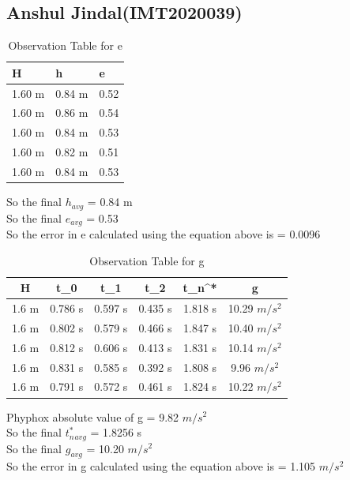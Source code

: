 \documentclass[11pt]{scrartcl} %
\begin{document}
\newpage
\subsection{Anshul Jindal(IMT2020039)}

\begin{table}[h] %
	\centering %
	\begin{tabular}{l l l}
		\toprule
		\textbf{H} & \textbf{h} & \textbf{e} \\
		\midrule
		1.60 m & 0.84 m & 0.52\\
        1.60 m & 0.86 m & 0.54\\
        1.60 m & 0.84 m & 0.53\\
        1.60 m & 0.82 m & 0.51 \\
        1.60 m & 0.84 m & 0.53 \\
		\bottomrule
	\end{tabular}
	\caption{Observation Table for e}
\end{table}
So the final $h_{avg}$ = 0.84 m\\
So the final $e_{avg}$ = 0.53\\
So the error in e calculated using the equation above is  = 0.0096 

\begin{table}[h]
\centering
\begin{tabular}{||c c c c c c||} 
\toprule
 \hline
 H & t_0 & t_1 & t_2 & t_n^* & g \\ [0.5ex] 
 \midrule
 \hline\hline
 1.6 m & 0.786 s & 0.597 s  & 0.435 s & 1.818 s & 10.29 $m/s^2$ \\
 \hline
 1.6 m & 0.802 s & 0.579 s & 0.466 s & 1.847 s & 10.40 $m/s^2$  \\
 \hline
 1.6 m & 0.812 s & 0.606 s & 0.413 s & 1.831 s  & 10.14 $m/s^2$ \\
 \hline
 1.6 m & 0.831 s & 0.585 s & 0.392 s & 1.808 s  & 9.96 $m/s^2$  \\
 \hline
 1.6 m & 0.791 s & 0.572 s & 0.461 s & 1.824 s  & 10.22 $m/s^2$ \\ [1ex]
 \bottomrule
 \hline
\end{tabular}
\caption{Observation Table for g}
\end{table}
Phyphox absolute value of g = 9.82 $m/s^2$\\
So the final $t_n^*_{avg}$ = 1.8256 s\\
So the final $g_{avg}$ = 10.20 $m/s^2$\\
So the error in g calculated using the equation above is  = 1.105  $m/s^2$\\
\end{document}
